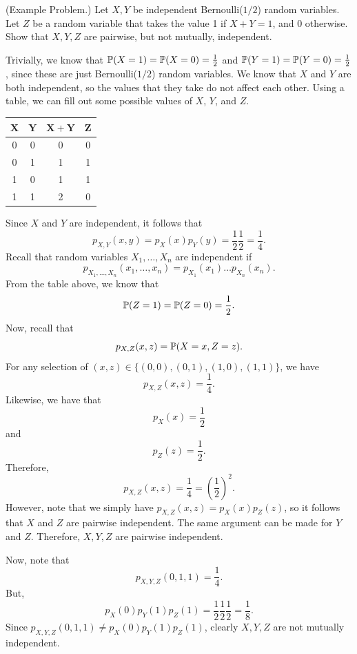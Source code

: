 \begin{mdframed}[]
    (Example Problem.) Let $X, Y$ be independent Bernoulli($1/2$) random variables. Let $Z$ be a random variable that takes the value 1 if $X + Y = 1$, and 0 otherwise. Show that $X, Y, Z$ are pairwise, but not mutually, independent.

    \begin{mdframed}[]
        Trivially, we know that $\mathbb{P}(X = 1) = \mathbb{P}(X = 0) = \frac{1}{2}$ and $\mathbb{P}(Y = 1) = \mathbb{P}(Y = 0) = \frac{1}{2}$, since these are just Bernoulli($1/2$) random variables. We know that $X$ and $Y$ are both independent, so the values that they take do not affect each other. Using a table, we can fill out some possible values of $X$, $Y$, and $Z$. 
        \begin{center}
            \begin{tabular}{c|c|c|c}
                $\mathbf{X}$ & $\mathbf{Y}$ & $\mathbf{X + Y}$ & $\mathbf{Z}$ \\ 
                \hline 
                0 & 0 & 0 & 0 \\ 
                0 & 1 & 1 & 1 \\ 
                1 & 0 & 1 & 1 \\ 
                1 & 1 & 2 & 0 
            \end{tabular}
        \end{center}
        Since $X$ and $Y$ are independent, it follows that 
        \[p_{X, Y}(x, y) = p_{X}(x) p_{Y}(y) = \frac{1}{2} \frac{1}{2} = \frac{1}{4}.\]
        Recall that random variables $X_1, \dots, X_n$ are independent if
        \[p_{X_1, \dots, X_n}(x_1, \dots, x_n) = p_{X_1}(x_1) \dots p_{X_n}(x_n).\]
        From the table above, we know that 
        \[\mathbb{P}(Z = 1) = \mathbb{P}(Z = 0) = \frac{1}{2}.\]
        Now, recall that 
        \[p_{X, Z}(x, z) = \mathbb{P}(X = x, Z = z).\]
        For any selection of $(x, z) \in \{(0, 0), (0, 1), (1, 0), (1, 1)\}$, we have 
        \[p_{X, Z}(x, z) = \frac{1}{4}.\]
        Likewise, we have that 
        \[p_{X}(x) = \frac{1}{2}\]
        and 
        \[p_{Z}(z) = \frac{1}{2}.\]
        Therefore, 
        \[p_{X, Z}(x, z) = \frac{1}{4} = \left(\frac{1}{2}\right)^2.\]
        However, note that we simply have $p_{X, Z}(x, z) = p_{X}(x) p_{Z}(z)$, so it follows that $X$ and $Z$ are pairwise independent. The same argument can be made for $Y$ and $Z$. Therefore, $X, Y, Z$ are pairwise independent. 
    
        \bigskip 
    
        Now, note that 
        \[p_{X, Y, Z}(0, 1, 1) = \frac{1}{4}.\]
        But, 
        \[p_{X}(0)p_{Y}(1)p_{Z}(1) = \frac{1}{2}\frac{1}{2}\frac{1}{2} = \frac{1}{8}.\]
        Since $p_{X, Y, Z}(0, 1, 1) \neq p_{X}(0)p_{Y}(1)p_{Z}(1)$, clearly $X, Y, Z$ are not mutually independent. 
    \end{mdframed}
\end{mdframed}



